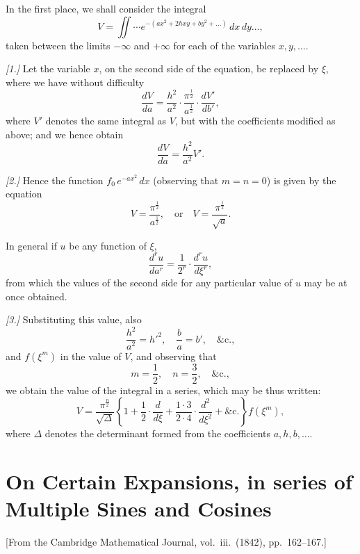 \documentclass[11pt,a4paper]{book}
\theoremstyle{plain}
\theoremstyle{definition}
\theoremstyle{remark}
\begin{document}
In the first place, we shall consider the integral
\[
V = \iint \cdots e^{-(ax^2 + 2hxy + by^2 + \ldots)}\, dx\, dy \ldots,
\]
taken between the limits $-\infty$ and $+\infty$ for each of the variables $x, y, \ldots$.

\textit{[1.]} Let the variable $x$, on the second side of the equation, be replaced by $\xi$, where we have without difficulty
\[
\frac{dV}{da} = \frac{h^2}{a^2} \cdot \frac{\pi^{\frac{1}{2}}}{a^{\frac{1}{2}}} \cdot \frac{dV'}{db'},
\]
where $V'$ denotes the same integral as $V$, but with the coefficients modified as above; and we hence obtain
\[
\frac{dV}{da} = \frac{h^2}{a^2} V'.
\]

\textit{[2.]} Hence the function $f_0\, e^{-ax^2}\, dx$ (observing that $m = n = 0$) is given by the equation
\[
V = \frac{\pi^{\frac{1}{2}}}{a^{\frac{1}{2}}}, \quad \text{or} \quad V = \frac{\pi^{\frac{1}{2}}}{\sqrt{a}}.
\]

In general if $u$ be any function of $\xi$,
\[
\frac{d^r u}{da^r} = \frac{1}{2^r} \cdot \frac{d^r u}{d\xi^r},
\]
from which the values of the second side for any particular value of $u$ may be at once obtained.

\textit{[3.]} Substituting this value, also
\[
\frac{h^2}{a^2} = h'^2, \quad \frac{b}{a} = b', \quad \&\mathrm{c.},
\]
and $f(\xi^m)$ in the value of $V$, and observing that
\[
m = \frac{1}{2}, \quad n = \frac{3}{2}, \quad \&\mathrm{c.},
\]
we obtain the value of the integral in a series, which may be thus written:
\[
V = \frac{\pi^{\frac{n}{2}}}{\sqrt{\Delta}} \left\{1 + \frac{1}{2} \cdot \frac{d}{d\xi} + \frac{1 \cdot 3}{2 \cdot 4} \cdot \frac{d^2}{d\xi^2} + \&\mathrm{c.}\right\} f(\xi^m),
\]
where $\Delta$ denotes the determinant formed from the coefficients $a, h, b, \ldots$.

\cleardoublepage

\chapter{On Certain Expansions, in series of Multiple Sines and Cosines}
\label{chap:paper4}

\begin{center}
\small[From the Cambridge Mathematical Journal, vol.~iii.\ (1842), pp.~162--167.]
\end{center}

\section*{}
\end{document}
